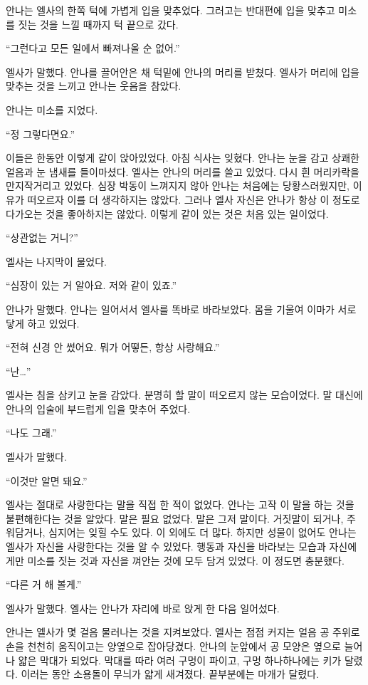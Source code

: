 안나는 엘사의 한쪽 턱에 가볍게 입을 맞추었다. 그러고는 반대편에 입을 맞추고 미소를 짓는 것을 느낄 때까지 턱 끝으로 갔다.

``그런다고 모든 일에서 빠져나올 순 없어.''

엘사가 말했다. 안나를 끌어안은 채 턱밑에 안나의 머리를 받쳤다. 엘사가 머리에 입을 맞추는 것을 느끼고 안나는 웃음을 참았다.

안나는 미소를 지었다.

``정 그렇다면요.''

이들은 한동안 이렇게 같이 앉아있었다. 아침 식사는 잊혔다. 안나는 눈을 감고 상쾌한 얼음과 눈 냄새를 들이마셨다. 엘사는 안나의 머리를 쓸고 있었다. 다시 흰 머리카락을 만지작거리고 있었다. 심장 박동이 느껴지지 않아 안나는 처음에는 당황스러웠지만, 이유가 떠오르자 이를 더 생각하지는 않았다. 그러나 엘사 자신은 안나가 항상 이 정도로 다가오는 것을 좋아하지는 않았다. 이렇게 같이 있는 것은 처음 있는 일이었다.

``상관없는 거니?''

엘사는 나지막이 물었다.

``심장이 있는 거 알아요. 저와 같이 있죠.''

안나가 말했다. 안나는 일어서서 엘사를 똑바로 바라보았다. 몸을 기울여 이마가 서로 닿게 하고 있었다.

``전혀 신경 안 썼어요. 뭐가 어떻든, 항상 사랑해요.''

``난\ldots''

엘사는 침을 삼키고 눈을 감았다. 분명히 할 말이 떠오르지 않는 모습이었다. 말 대신에 안나의 입술에 부드럽게 입을 맞추어 주었다.

``나도 그래.''

엘사가 말했다.

``이것만 알면 돼요.''

엘사는 절대로 사랑한다는 말을 직접 한 적이 없었다. 안나는 고작 이 말을 하는 것을 불편해한다는 것을 알았다. 말은 필요 없었다. 말은 그저 말이다. 거짓말이 되거나, 주워담거나, 심지어는 잊힐 수도 있다. 이 외에도 더 많다. 하지만 성물이 없어도 안나는 엘사가 자신을 사랑한다는 것을 알 수 있었다. 행동과 자신을 바라보는 모습과 자신에게만 미소를 짓는 것과 자신을 껴안는 것에 모두 담겨 있었다. 이 정도면 충분했다.

``다른 거 해 볼게.''

엘사가 말했다. 엘사는 안나가 자리에 바로 앉게 한 다음 일어섰다.

안나는 엘사가 몇 걸음 물러나는 것을 지켜보았다. 엘사는 점점 커지는 얼음 공 주위로 손을 천천히 움직이고는 양옆으로 잡아당겼다. 안나의 눈앞에서 공 모양은 옆으로 늘어나 얇은 막대가 되었다. 막대를 따라 여러 구멍이 파이고, 구멍 하나하나에는 키가 달렸다. 이러는 동안 소용돌이 무늬가 얇게 새겨졌다. 끝부분에는 마개가 달렸다.

